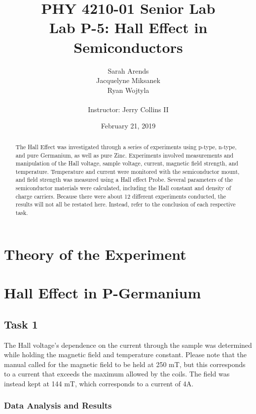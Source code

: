 \documentclass[a4paper]{article}
\title{PHY 4210-01 Senior Lab \\Lab P-5: Hall Effect in Semiconductors}
\author{Sarah Arends \\
        Jacquelyne Miksanek \\
        Ryan Wojtyla \\ \\
        Instructor: Jerry Collins II}
\date{February 21, 2019}
\begin{document}
\maketitle

\begin{abstract}
\qq The Hall Effect was investigated through a series of experiments
using p-type, n-type, and pure Germanium, as well as pure
Zinc. Experiments involved measurements and manipulation of the Hall
voltage, sample voltage, current, magnetic field strength, and
temperature. Temperature and current were monitored with the
semiconductor mount, and field strength was measured using a Hall
effect Probe. Several parameters of the semiconductor materials were
calculated, including the Hall constant and density of charge
carriers. Because there were about 12 different experiments conducted,
the results will not all be restated here. Instead, refer to the
conclusion of each respective task.
\end{abstract}

\newpage

\setcounter{tocdepth}{2}
\tableofcontents

\newpage

\section{Theory of the Experiment}

\section{Hall Effect in P-Germanium}

\subsection{Task 1}

\qq The Hall voltage's dependence on the current through the sample
was determined while holding the magnetic field and temperature
constant. Please note that the manual called for the magnetic field to
be held at 250 mT, but this corresponds to a current that exceeds the
maximum allowed by the coils. The field was instead kept at 144 mT,
which corresponds to a current of 4A.

\subsubsection{Data Analysis and Results}
\end{document}
